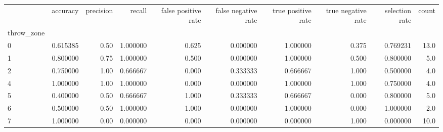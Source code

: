 \begin{tabular}{lrrrrrrrrr}
\toprule
{} &  accuracy &  precision &    recall &  false positive rate &  false negative rate &  true positive rate &  true negative rate &  selection rate &  count \\
throw\_zone &           &            &           &                      &                      &                     &                     &                 &        \\
\midrule
0          &  0.615385 &       0.50 &  1.000000 &                0.625 &             0.000000 &            1.000000 &               0.375 &        0.769231 &   13.0 \\
1          &  0.800000 &       0.75 &  1.000000 &                0.500 &             0.000000 &            1.000000 &               0.500 &        0.800000 &    5.0 \\
2          &  0.750000 &       1.00 &  0.666667 &                0.000 &             0.333333 &            0.666667 &               1.000 &        0.500000 &    4.0 \\
4          &  1.000000 &       1.00 &  1.000000 &                0.000 &             0.000000 &            1.000000 &               1.000 &        0.750000 &    4.0 \\
5          &  0.400000 &       0.50 &  0.666667 &                1.000 &             0.333333 &            0.666667 &               0.000 &        0.800000 &    5.0 \\
6          &  0.500000 &       0.50 &  1.000000 &                1.000 &             0.000000 &            1.000000 &               0.000 &        1.000000 &    2.0 \\
7          &  1.000000 &       0.00 &  0.000000 &                0.000 &             0.000000 &            0.000000 &               1.000 &        0.000000 &   10.0 \\
\bottomrule
\end{tabular}
